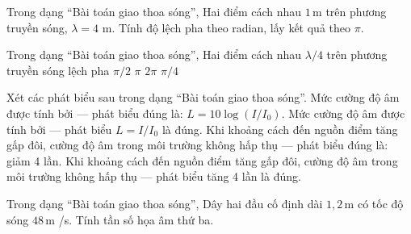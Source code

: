 \begin{ex}
Trong dạng “Bài toán giao thoa sóng”, Hai điểm cách nhau $1\,\text{m}$ trên phương truyền sóng, $\lambda=4$ m. Tính độ lệch pha theo radian, lấy kết quả theo $\pi$.
\end{ex}

\begin{ex}
Trong dạng “Bài toán giao thoa sóng”, Hai điểm cách nhau $\lambda/4$ trên phương truyền sóng lệch pha
\choice
{\True $\pi/2$}
{$\pi$}
{$2\pi$}
{$\pi/4$}
\end{ex}

\begin{ex}
Xét các phát biểu sau trong dạng “Bài toán giao thoa sóng”.
\choiceTF
{\True Mức cường độ âm được tính bởi — phát biểu đúng là: $L=10\log(I/I_0)$.}
{Mức cường độ âm được tính bởi — phát biểu $L=I/I_0$ là đúng.}
{\True Khi khoảng cách đến nguồn điểm tăng gấp đôi, cường độ âm trong môi trường không hấp thụ — phát biểu đúng là: giảm 4 lần.}
{Khi khoảng cách đến nguồn điểm tăng gấp đôi, cường độ âm trong môi trường không hấp thụ — phát biểu tăng 4 lần là đúng.}
\end{ex}

\begin{bt}
Trong dạng “Bài toán giao thoa sóng”, Dây hai đầu cố định dài $1,2\,\text{m}$ có tốc độ sóng $48\,\text{m}$ /s. Tính tần số họa âm thứ ba.
\end{bt}

